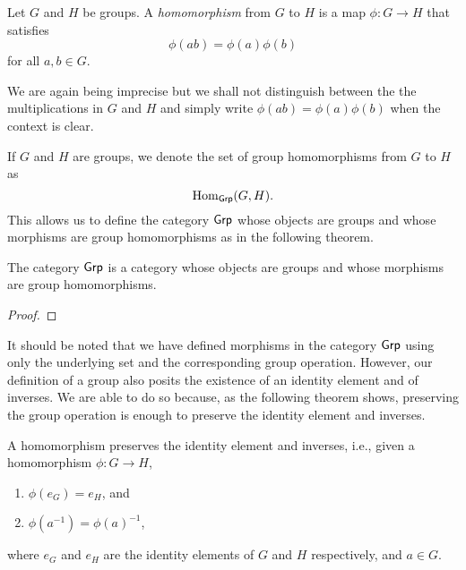\begin{definition}
    Let \(G\) and \(H\) be groups. A \emph{homomorphism} from \(G\) to \(H\) is
    a map \(\phi: G \to H\) that satisfies
    \[
        \phi(ab) = \phi(a)\phi(b)
    \]
    for all \(a, b \in G\).
\end{definition}

\begin{remark}
    We are again being imprecise but we shall not distinguish between the the
    multiplications in \(G\) and \(H\) and simply write \(\phi(ab) =
    \phi(a)\phi(b)\) when the context is clear.
\end{remark}

\begin{definition}
    If \(G\) and \(H\) are groups, we denote the set of group homomorphisms from
    \(G\) to \(H\) as
    \[
        \operatorname{Hom}_{\mathsf{Grp}}(G, H).
    \]
    This allows us to define the category \(\mathsf{Grp}\) whose objects are groups and
    whose morphisms are group homomorphisms as in the following theorem.
\end{definition}

\begin{theorem}
    The category \(\mathsf{Grp}\) is a category whose objects are groups and whose
    morphisms are group homomorphisms.
\end{theorem}

\begin{proof}
    
\end{proof}

\begin{sectionthm}
    It should be noted that we have defined morphisms in the category \(\mathsf{Grp}\)
    using only the underlying set and the corresponding group operation.
    However, our definition of a group also posits the existence of an identity
    element and of inverses. We are able to do so because, as the following
    theorem shows, preserving the group operation is enough to preserve the
    identity element and inverses.
\end{sectionthm}

\begin{theorem}
    A homomorphism preserves the identity element and inverses, i.e., given a
    homomorphism \(\phi: G \to H\),
    \begin{enumerate}[label=(\alph*)]
        \item \(\phi(e_G) = e_H\), and
        \item \(\phi(a^{-1}) = \phi(a)^{-1}\),
    \end{enumerate}
    where \(e_G\) and \(e_H\) are the identity elements of \(G\) and \(H\)
    respectively, and \(a \in G\).
\end{theorem}


